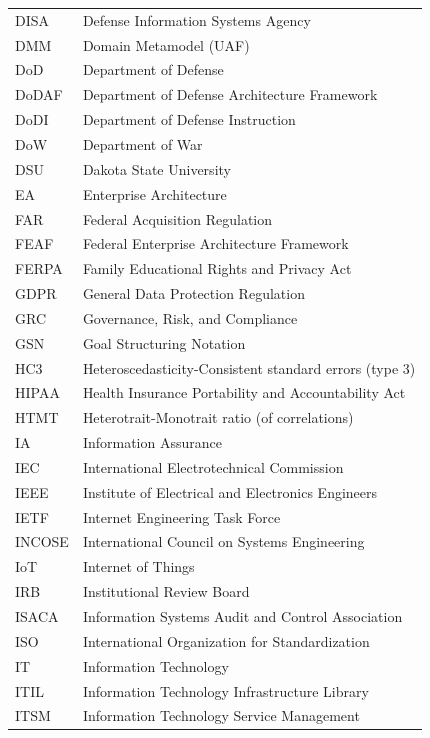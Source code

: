 \begin{singlespace}
\begin{longtable}{p{} p{}}
DISA      & Defense Information Systems Agency \\
DMM       & Domain Metamodel (UAF) \\
DoD       & Department of Defense \\
DoDAF     & Department of Defense Architecture Framework \\
DoDI      & Department of Defense Instruction \\
DoW       & Department of War \\
DSU       & Dakota State University \\
EA        & Enterprise Architecture \\
FAR       & Federal Acquisition Regulation \\
FEAF      & Federal Enterprise Architecture Framework \\
FERPA     & Family Educational Rights and Privacy Act \\
GDPR      & General Data Protection Regulation \\
GRC       & Governance, Risk, and Compliance \\
GSN       & Goal Structuring Notation \\
HC3       & Heteroscedasticity-Consistent standard errors (type 3) \\
HIPAA     & Health Insurance Portability and Accountability Act \\
HTMT      & Heterotrait-Monotrait ratio (of correlations) \\
IA        & Information Assurance \\
IEC       & International Electrotechnical Commission \\
IEEE      & Institute of Electrical and Electronics Engineers \\
IETF      & Internet Engineering Task Force \\
INCOSE    & International Council on Systems Engineering \\
IoT       & Internet of Things \\
IRB       & Institutional Review Board \\
ISACA     & Information Systems Audit and Control Association \\
ISO       & International Organization for Standardization \\
IT        & Information Technology \\
ITIL      & Information Technology Infrastructure Library \\
ITSM      & Information Technology Service Management \\

\end{longtable}
\end{singlespace}
